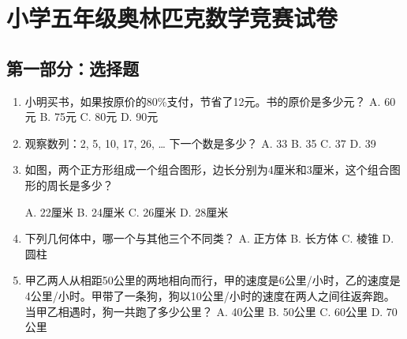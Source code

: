 \documentclass[12pt]{ctexart}
\begin{document}
\section*{小学五年级奥林匹克数学竞赛试卷}

\subsection*{第一部分：选择题}
\begin{enumerate}[label=\arabic*., left=0pt]
\item 小明买书，如果按原价的80\%支付，节省了12元。书的原价是多少元？
\newline
\hspace*{0.5cm} A. 60元 \hfill B. 75元 \hfill C. 80元 \hfill D. 90元

\item 观察数列：2, 5, 10, 17, 26, … 下一个数是多少？
\newline
\hspace*{0.5cm} A. 33 \hfill B. 35 \hfill C. 37 \hfill D. 39

\item 如图，两个正方形组成一个组合图形，边长分别为4厘米和3厘米，这个组合图形的周长是多少？
\begin{figure}[H]
\flushright
{}
\end{figure}
\vspace{2cm}
\hspace*{0.5cm} A. 22厘米 \hfill B. 24厘米 \hfill C. 26厘米 \hfill D. 28厘米

\item 下列几何体中，哪一个与其他三个不同类？
\newline
\hspace*{0.5cm} A. 正方体 \hfill B. 长方体 \hfill C. 棱锥 \hfill D. 圆柱

\item 甲乙两人从相距50公里的两地相向而行，甲的速度是6公里/小时，乙的速度是4公里/小时。甲带了一条狗，狗以10公里/小时的速度在两人之间往返奔跑。当甲乙相遇时，狗一共跑了多少公里？
\newline
\hspace*{0.5cm} A. 40公里 \hfill B. 50公里 \hfill C. 60公里 \hfill D. 70公里
\end{enumerate}
\end{document}
